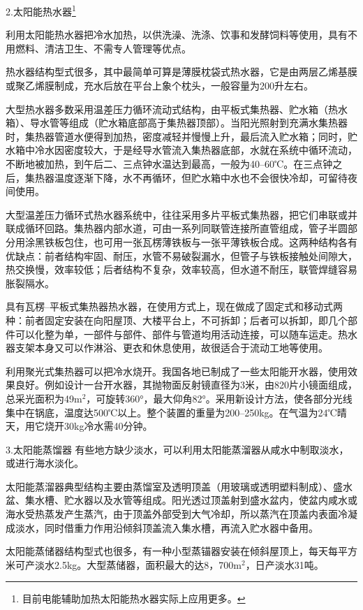 \documentclass{ctexbook}
\begin{document}
2.太阳能热水器\footnote{目前电能辅助加热太阳能热水器实际上应用更多。}

利用太阳能热水器把冷水加热，以供洗澡、洗涤、饮事和发酵饲料等使用，具有不用燃料、清洁卫生、不需专人管理等优点。

热水器结构型式很多，其中最简单可算是薄膜枕袋式热水器，它是由两层乙烯基膜或聚乙烯膜制成，充水后放在平台上象个枕头，一般容量为200升左右。

大型热水器多数采用温差压力循环流动式结构，由平板式集热器、贮水箱（热水箱）、导水管等组成（贮水箱底部高于集热器顶部）。当阳光照射到充满水集热器时，集热器管道水便得到加热，密度减轻并慢慢上升，最后流入贮水箱；同时，贮水箱中冷水因密度较大，于是经导水管流入集热器底部，水就在系统中循环流动，不断地被加热，到午后二、三点钟水温达到最高，一般为40--60℃。在三点钟之后，集热器温度逐渐下降，水不再循环，但贮水箱中水也不会很快冷却，可留待夜间使用。

大型温差压力循环式热水器系统中，往往采用多片平板式集热器，把它们串联或并联成循环回路。集热器内部水道，可由一系列同联管连接所直管组成，管子半圆部分用涂黑铁板包住，也可用一张瓦楞薄铁板与一张平薄铁板合成。这两种结构各有优缺点：前者结构牢固、耐压，水管不易破裂漏水，但管子与铁板接触处间隙大，热交换慢，效率较低；后者结构不复杂，效率较高，但水道不耐压，联管焊缝容易胀裂隔水。

具有瓦楞--平板式集热器热水器，在使用方式上，现在做成了固定式和移动式两种：前者固定安装在向阳屋顶、大楼平台上，不可拆卸；后者可以拆卸，即几个部件可以化整为单，一部件与部件、部件与管道均用活动连接，可以随车运走。热水器支架本身又可以作淋浴、更衣和休息使用，故很适合于流动工地等使用。

利用聚光式集热器可以把冷水烧开。我国各地已制成了一些太阳能开水器，使用效果良好。例如设计一台开水器，其抛物面反射镜直径为3米，由820片小镜面组成，总采光面积为49m$^{2}$，可旋转360°，最大仰角82°。采用新设计方法，使各部分光线集中在锅底，温度达500℃以上。整个装置的重量为200--250kg。在气温为24℃晴天，用它烧开30kg冷水需40分钟。

3.太阳能蒸馏器
有些地方缺少淡水，可以利用太阳能蒸溜器从咸水中制取淡水，或进行海水淡化。

太阳能蒸溜器典型结构主要由蒸馏室及透明顶盖（用玻璃或透明塑料制成）、盛水盆、集水槽、贮水器以及水管等组成。阳光透过顶盖射到盛水盆内，使盆内咸水或海水受热蒸发产生蒸汽，由于顶盖外部受到大气冷却，所以蒸汽在顶盖内表面冷凝成淡水，同时借重力作用沿倾斜顶盖流入集水槽，再流入贮水器中备用。

太阳能蒸储器结构型式也很多，有一种小型蒸锚器安装在倾斜屋顶上，每天每平方米可产淡水2.5kg。大型蒸储器，面积最大的达8，700m$^{2}$，日产淡水31吨。
\end{document}
